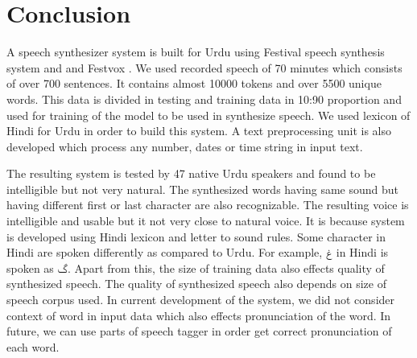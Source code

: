 \chapter{Conclusion}

A speech synthesizer system is built for Urdu using Festival speech synthesis system \cite{thefestivalspeechsynthesissystem} and and Festvox \cite{festvox}. We used recorded speech of 70 minutes which consists of over 700 sentences. It contains almost 10000 tokens and over 5500 unique words. This data is divided in testing and training data in 10:90 proportion and used for training of the model to be used in synthesize speech. We used lexicon of Hindi for Urdu in order to build this system. A text preprocessing unit is also developed which process any number, dates or time string in input text. 

The resulting system is tested by 47 native Urdu speakers and found to be intelligible but not very natural. The synthesized words having same sound but having different first or last character are also recognizable. The resulting voice is intelligible and usable but it not very close to natural voice. It is because system is developed using Hindi lexicon and letter to sound rules. Some character in Hindi are spoken differently as compared to Urdu. For example, \texturdu{‫غ‬} in Hindi is spoken as \texturdu{گ}. Apart from this, the size of training data also effects quality of synthesized speech. The quality of synthesized speech also depends on size of speech corpus used. In current development of the system, we did not consider context of word in input data which also effects pronunciation of the word. In future, we can use parts of speech tagger in order get correct pronunciation of each word. 



